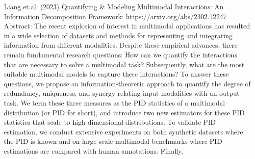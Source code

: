 \documentclass{article}%
\begin{document}
%
Liang et.al. (2023) Quantifying \& Modeling Multimodal Interactions: An Information Decomposition Framework: https://arxiv.org/abs/2302.12247 %
\newline%
\newline%
%
Abstract: The recent explosion of interest in multimodal applications has resulted in a wide%
\newline%
\newline%
%
selection of datasets and methods for representing and integrating information from%
\newline%
\newline%
%
different modalities. Despite these empirical advances, there remain fundamental%
\newline%
\newline%
%
research questions: How can we quantify the interactions that are necessary to%
\newline%
\newline%
%
solve a multimodal task? Subsequently, what are the most suitable multimodal%
\newline%
\newline%
%
models to capture these interactions? To answer these questions, we propose an%
\newline%
\newline%
%
information{-}theoretic approach to quantify the degree of redundancy, uniqueness,%
\newline%
\newline%
%
and synergy relating input modalities with an output task. We term these three%
\newline%
\newline%
%
measures as the PID statistics of a multimodal distribution (or PID for short), and%
\newline%
\newline%
%
introduce two new estimators for these PID statistics that scale to high{-}dimensional%
\newline%
\newline%
%
distributions. To validate PID estimation, we conduct extensive experiments on%
\newline%
\newline%
%
both synthetic datasets where the PID is known and on large{-}scale multimodal%
\newline%
\newline%
%
benchmarks where PID estimations are compared with human annotations. Finally,%
\newline%
\newline%
\end{document}
